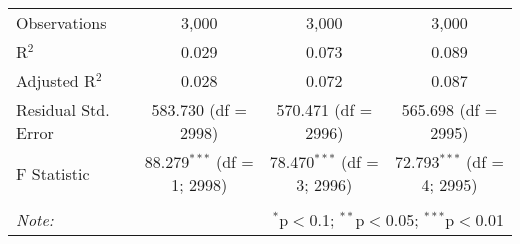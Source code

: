 \begin{table}[!htbp]
\begin{tabular}{@{\extracolsep{5pt}}lccc}
Observations & 3,000 & 3,000 & 3,000 \\                                                                                            
R$^{2}$ & 0.029 & 0.073 & 0.089 \\                                                                                                 
Adjusted R$^{2}$ & 0.028 & 0.072 & 0.087 \\                                                                                        
Residual Std. Error & 583.730 (df = 2998) & 570.471 (df = 2996) & 565.698 (df = 2995) \\                                           
F Statistic & 88.279$^{***}$ (df = 1; 2998) & 78.470$^{***}$ (df = 3; 2996) & 72.793$^{***}$ (df = 4; 2995) \\                     
\hline                                                                                                                             
\hline \\[-1.8ex]                                                                                                                  
\textit{Note:}  & \multicolumn{3}{r}{$^{*}$p$<$0.1; $^{**}$p$<$0.05; $^{***}$p$<$0.01} \\                                          
\end{tabular}                                                                                                                      
\end{table}                                                                                                                     